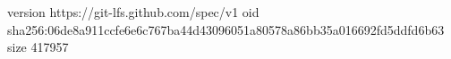 version https://git-lfs.github.com/spec/v1
oid sha256:06de8a911ccfe6e6c767ba44d43096051a80578a86bb35a016692fd5ddfd6b63
size 417957
